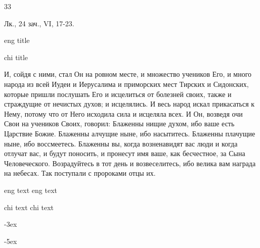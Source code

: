 33

\singlespacing %

\onehalfspacing %

\Large%

Лк., 24 зач., VI, 17-23.

eng title

chi title

И, сойдя с ними, стал Он на ровном месте, и множество учеников Его, и много народа из всей Иудеи и Иерусалима и приморских мест Тирских и Сидонских,
которые пришли послушать Его и исцелиться от болезней своих, также и страждущие от нечистых духов; и исцелялись.
И весь народ искал прикасаться к Нему, потому что от Него исходила сила и исцеляла всех.
И Он, возведя очи Свои на учеников Своих, говорил: Блаженны нищие духом, ибо ваше есть Царствие Божие.
Блаженны алчущие ныне, ибо насытитесь. Блаженны плачущие ныне, ибо воссмеетесь.
Блаженны вы, когда возненавидят вас люди и когда отлучат вас, и будут поносить, и пронесут имя ваше, как бесчестное, за Сына Человеческого.
Возрадуйтесь в тот день и возвеселитесь, ибо велика вам награда на небесах. Так поступали с пророками отцы их. 

eng text
eng text

chi text
chi text

\Huge%

-3ex%

-5ex%
